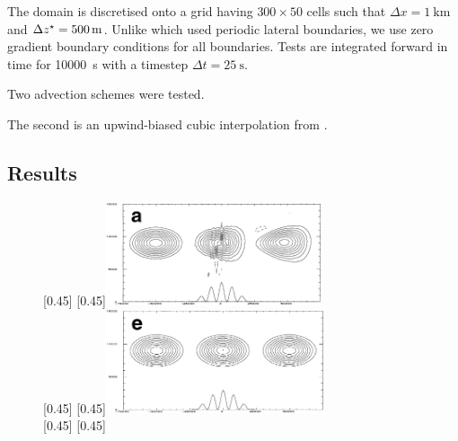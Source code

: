 The domain is discretised onto a grid having $300 \times 50$ cells such that $\Delta x = \SI{1}{\kilo\meter}$ and $\Delta {z^\star} = \SI{500}{\meter}$.  Unlike \textcite{schaer2002} which used periodic lateral boundaries, we use zero gradient boundary conditions for all boundaries.
Tests are integrated forward in time for \SI{10000}{\second} with a timestep $\Delta t = \SI{25}{\second}$.  


Two advection schemes were tested.

The second is an upwind-biased cubic interpolation from \cite{weller2009}.  

\subsection{Results}
\begin{figure}
	\captionsetup[subfigure]{position=b}
	\centering
	[0.45\textwidth]{}
	\hfill
	[0.45\textwidth]{\includegraphics[height=1.2in]{img/schaer-btf-centred.png}}
\\
	[0.45\textwidth]{\TODO{}}
	\hfill
	[0.45\textwidth]{\includegraphics[height=1.2in]{img/schaer-sleve-centred.png}}
\\
	[0.45\textwidth]{}
	\hfill
	[0.45\textwidth]{\TODO{}}
%
	\caption{}
	\label{fig:advection:vanLeer}
\end{figure}

